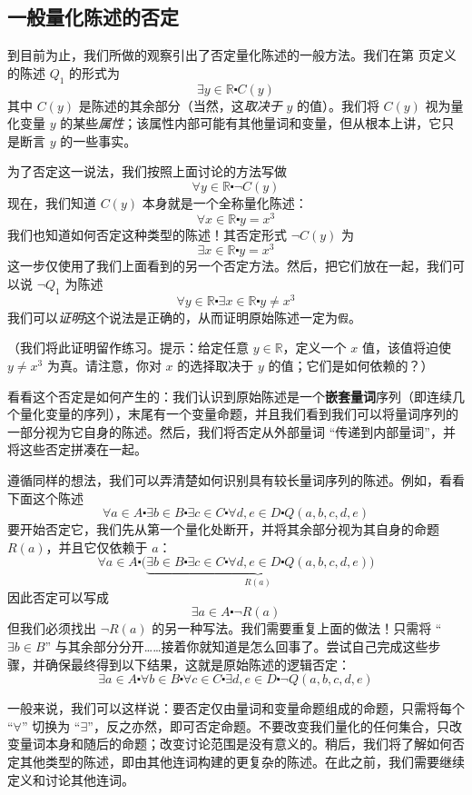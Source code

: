 \subsection{一般量化陈述的否定}

到目前为止，我们所做的观察引出了否定量化陈述的一般方法。我们在第 \pageref{sec:section4.4} 页定义的陈述 $Q_1$ 的形式为
\[\exists y \in \mathbb{R} \centerdot C(y)\]
其中 $C(y)$ 是陈述的其余部分（当然，这\emph{取决于} $y$ 的值）。我们将 $C(y)$ 视为量化变量 $y$ 的某些\emph{属性}；该属性内部可能有其他量词和变量，但从根本上讲，它只是断言 $y$ 的一些事实。

为了否定这一说法，我们按照上面讨论的方法写做
\[\forall y \in \mathbb{R} \centerdot \neg C(y)\]
现在，我们知道 $C(y)$ 本身就是一个全称量化陈述：
\[\forall x \in \mathbb{R} \centerdot y = x^3\]
我们也知道如何否定这种类型的陈述！其否定形式 $\neg C(y)$ 为
\[\exists x \in \mathbb{R} \centerdot y = x^3\]
这一步仅使用了我们上面看到的另一个否定方法。然后，把它们放在一起，我们可以说 $\neg Q_1$ 为陈述
\[\forall y \in \mathbb{R} \centerdot \exists x \in \mathbb{R} \centerdot y \ne x^3\]
我们可以\emph{证明}这个说法是正确的，从而证明原始陈述一定为\verb|假|。

（我们将此证明留作练习。提示：给定任意 $y \in \mathbb{R}$，定义一个 $x$ 值，该值将迫使 $y \ne x^3$ 为真。请注意，你对 $x$ 的选择取决于 $y$ 的值；它们是如何依赖的？）

看看这个否定是如何产生的：我们认识到原始陈述是一个\textbf{嵌套量词}序列（即连续几个量化变量的序列），末尾有一个变量命题，并且我们看到我们可以将量词序列的一部分视为它自身的陈述。然后，我们将否定从外部量词 ``传递到内部量词''，并将这些否定拼凑在一起。

遵循同样的想法，我们可以弄清楚如何识别具有较长量词序列的陈述。例如，看看下面这个陈述
\[\forall a \in A \centerdot \exists b \in B \centerdot \exists c \in C \centerdot \forall d, e \in D \centerdot Q(a, b, c, d, e)\]
要开始否定它，我们先从第一个量化处断开，并将其余部分视为其自身的命题 $R(a)$，并且它仅依赖于 $a$：
\[\forall a \in A \centerdot \big(\underbrace{\exists b \in B \centerdot \exists c \in C \centerdot \forall d, e \in D \centerdot Q(a, b, c, d, e)}_{R(a)}\big)\]
因此否定可以写成
\[\exists a \in A \centerdot \neg R(a)\]
但我们必须找出 $\neg R(a)$ 的另一种写法。我们需要重复上面的做法！只需将 ``$\exists b \in B$'' 与其余部分分开……接着你就知道是怎么回事了。尝试自己完成这些步骤，并确保最终得到以下结果，这就是原始陈述的逻辑否定：
\[\exists a \in A \centerdot \forall b \in B \centerdot \forall c \in C \centerdot \exists d, e \in D \centerdot \neg Q(a, b, c, d, e)\]

一般来说，我们可以这样说：要否定仅由量词和变量命题组成的命题，只需将每个 ``$\forall$'' 切换为 ``$\exists$''，反之亦然，即可否定命题。不要改变我们量化的任何集合，只改变量词本身和随后的命题；改变讨论范围是没有意义的。稍后，我们将了解如何否定其他类型的陈述，即由其他连词构建的更复杂的陈述。在此之前，我们需要继续定义和讨论其他连词。
